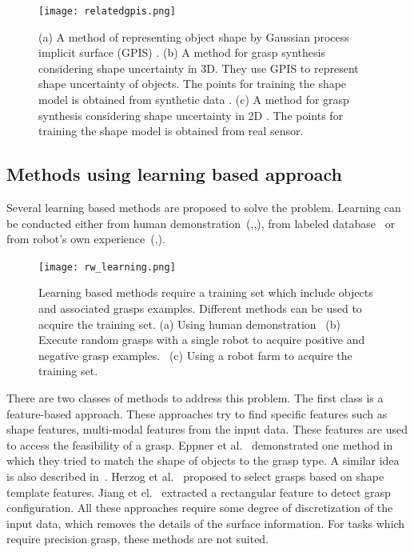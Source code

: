 \begin{figure}[!htbp]
\centering
\texttt{[image: relatedgpis.png]}
\captionsetup{justification=raggedright}
\caption{(a) A method of representing object shape by Gaussian process implicit surface (GPIS) \cite{Williams2007}. (b) A method for grasp synthesis considering shape uncertainty in 3D. They use GPIS to represent shape uncertainty of objects. The points for training the shape model is obtained from synthetic data \cite{Li2016}. (c) A method for grasp synthesis considering shape uncertainty in 2D \cite{Mahler2015}. The points for training the shape model is obtained from real sensor.} 
\label{fig:rw_gpis}       %
\end{figure} 
\subsection{Methods using learning based approach}
Several learning based methods are proposed to solve the problem. Learning can be conducted either from human demonstration~(\cite{Herzog2014},\cite{ekvall2007learning},\cite{Romero2009}), from labeled database~\cite{Lenz2015} or from robot's own experience~(\cite{Pinto2015},\cite{Levine2016}). 
\begin{figure}[!htbp]
\centering
\texttt{[image: rw\_learning.png]}
\captionsetup{justification=raggedright}
\caption{Learning based methods require a training set which include objects and associated grasps examples. Different methods can be used to acquire the training set. (a) Using human demonstration~\cite{Herzog2014} (b) Execute random grasps with a single robot to acquire positive and negative grasp examples.~\cite{Pinto2015} (c) Using a robot farm to acquire the training set.~\cite{Levine2016}} 
\label{fig:rw_deeplearning}       %
\end{figure}  
There are two classes of methods to address this problem. The first class is a feature-based approach. These approaches try to find specific features such as shape features, multi-modal features from the input data. These features are used to access the feasibility of a grasp. Eppner et al.~\cite{Eppner2013} demonstrated one method in which they tried to match the shape of objects to the grasp type. A similar idea is also described in~\cite{Huebner2008}. Herzog et al.~\cite{Herzog2014} proposed to select grasps based on shape template features. Jiang et el.~\cite{Jiang2011} extracted a rectangular feature to detect grasp configuration. All these approaches require some degree of discretization of the input data, which removes the details of the surface information. For tasks which require precision grasp, these methods are not suited.

